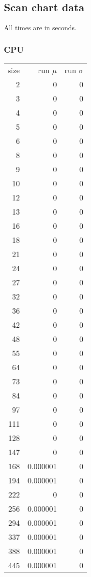 \subsection{Scan chart data}
\label{sec:scan_chart_data}

All times are in seconds.

\subsubsection{CPU}

\begin{longtable}{r r r}
size & run $\mu$ & run $\sigma$ \\
2 & 0 & 0 \\
3 & 0 & 0 \\
4 & 0 & 0 \\
5 & 0 & 0 \\
6 & 0 & 0 \\
8 & 0 & 0 \\
9 & 0 & 0 \\
10 & 0 & 0 \\
12 & 0 & 0 \\
13 & 0 & 0 \\
16 & 0 & 0 \\
18 & 0 & 0 \\
21 & 0 & 0 \\
24 & 0 & 0 \\
27 & 0 & 0 \\
32 & 0 & 0 \\
36 & 0 & 0 \\
42 & 0 & 0 \\
48 & 0 & 0 \\
55 & 0 & 0 \\
64 & 0 & 0 \\
73 & 0 & 0 \\
84 & 0 & 0 \\
97 & 0 & 0 \\
111 & 0 & 0 \\
128 & 0 & 0 \\
147 & 0 & 0 \\
168 & 0.000001 & 0 \\
194 & 0.000001 & 0 \\
222 & 0 & 0 \\
256 & 0.000001 & 0 \\
294 & 0.000001 & 0 \\
337 & 0.000001 & 0 \\
388 & 0.000001 & 0 \\
445 & 0.000001 & 0 \\

\end{longtable}
